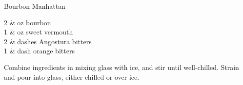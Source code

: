 \setHeadlines
{
}

\begin{recipe}
[ %
]
{Bourbon Manhattan}

    \ingredients
    {
		2 & oz bourbon \\
		1 & oz sweet vermouth \\
		2 & dashes Angostura bitters \\
		1 & dash orange bitters \\
    }
    
    \preparation
    {
        \step Combine ingredients in mixing glass with ice, and stir until well-chilled. 
		\step Strain and pour into glass, either chilled or over ice. \\
    }


\end{recipe}

